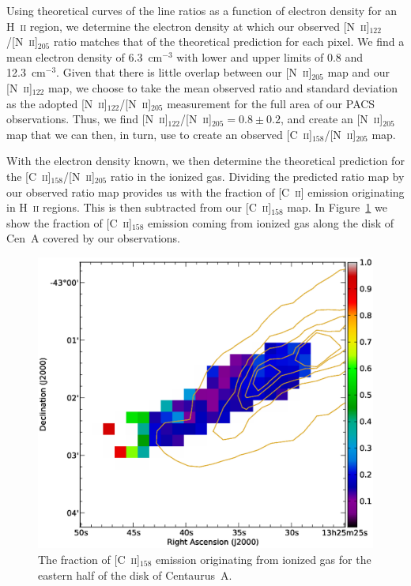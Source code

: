 \documentclass[preprint2]{aastex}
\begin{document}
Using theoretical curves of the line ratios as a function of electron density for an H~\textsc{ii} region, we determine the electron density at which our observed [N~\textsc{ii}]$_{122}$/[N~\textsc{ii}]$_{205}$ ratio matches that of the theoretical prediction for each pixel.  We find a mean electron density of 6.3~cm$^{-3}$ with lower and upper limits of 0.8 and 12.3~cm$^{-3}$.  Given that there is little overlap between our [N~\textsc{ii}]$_{205}$ map and our [N~\textsc{ii}]$_{122}$ map, we choose to take the mean observed ratio and standard deviation as the adopted [N~\textsc{ii}]$_{122}$/[N~\textsc{ii}]$_{205}$ measurement for the full area of our PACS observations.  Thus, we find [N~\textsc{ii}]$_{122}$/[N~\textsc{ii}]$_{205} = 0.8 \pm 0.2$, and create an [N~\textsc{ii}]$_{205}$ map that we can then, in turn, use to create an observed [C~\textsc{ii}]$_{158}$/[N~\textsc{ii}]$_{205}$ map.

With the electron density known, we then determine the theoretical prediction for the [C~\textsc{ii}]$_{158}$/[N~\textsc{ii}]$_{205}$ ratio in the ionized gas.  Dividing the predicted ratio map by our observed ratio map provides us with the fraction of [C~\textsc{ii}] emission originating in H~\textsc{ii} regions.  This is then subtracted from our [C~\textsc{ii}]$_{158}$ map.  In Figure~\ref{fig:cii_ion_map} we show the fraction of [C~\textsc{ii}]$_{158}$ emission coming from ionized gas along the disk of Cen~A covered by our observations.

\begin{figure}
\includegraphics[width=\columnwidth]{CenA_ion_fraction}
\caption{The fraction of [C~\textsc{ii}]$_{158}$ emission originating from ionized gas for the eastern half of the disk of Centaurus~A.}
\label{fig:cii_ion_map}
\end{figure}
\end{document}
